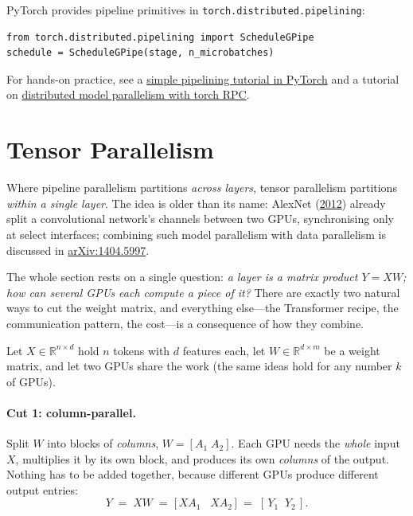 \documentclass[11pt,a4paper]{article}
\theoremstyle{definition}
\theoremstyle{remark}
\theoremstyle{plain}
\begin{document}
PyTorch provides pipeline primitives in
\texttt{torch.distributed.pipelining}:
\begin{lstlisting}
from torch.distributed.pipelining import ScheduleGPipe
schedule = ScheduleGPipe(stage, n_microbatches)
\end{lstlisting}

For hands-on practice, see a
\href{https://tinyurl.com/pytorch-pipelining}{simple pipelining tutorial
in PyTorch} and a tutorial on
\href{http://tinyurl.com/torch-rpc}{distributed model parallelism with
torch RPC}.

\section{Tensor Parallelism}
\label{sec:tp}

Where pipeline parallelism partitions \emph{across layers}, tensor
parallelism partitions \emph{within a single layer}. The idea is older
than its name: AlexNet
(\href{https://papers.nips.cc/paper/4824-imagenet-classification-with-deep-convolutional-neural-networks}{2012})
already split a convolutional network's channels between two GPUs,
synchronising only at select interfaces; combining such model parallelism
with data parallelism is discussed in
\href{https://arxiv.org/abs/1404.5997}{arXiv:1404.5997}.

The whole section rests on a single question: \emph{a layer is a matrix
product $Y=XW$; how can several GPUs each compute a piece of it?} There
are exactly two natural ways to cut the weight matrix, and everything
else---the Transformer recipe, the communication pattern, the cost---is a
consequence of how they combine.


Let $X\in\mathbb{R}^{n\times d}$ hold $n$ tokens with $d$ features each,
let $W\in\mathbb{R}^{d\times m}$ be a weight matrix, and let two GPUs
share the work (the same ideas hold for any number $k$ of GPUs).

\paragraph{Cut 1: column-parallel.}
Split $W$ into blocks of \emph{columns}, $W=[A_1\;A_2]$. Each GPU needs the
\emph{whole} input $X$, multiplies it by its own block, and produces its own
\emph{columns} of the output. Nothing has to be added together, because
different GPUs produce different output entries:
\[
  Y \;=\; XW \;=\; \bigl[\,XA_1 \;\;\; XA_2\,\bigr] \;=\; [\,Y_1\;\;Y_2\,].
\]
\end{document}
